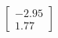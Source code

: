 \documentclass[preview]{standalone}
\begin{document}
\begin{align*}
\begin{bmatrix} -2.95 \\ 1.77 \end{bmatrix}
\end{align*}
\end{document}
